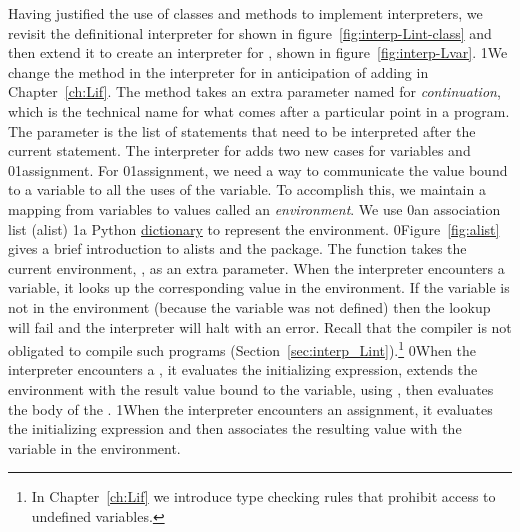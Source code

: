 \documentclass[7x10]{TimesAPriori_MIT}%
\def\racketEd{0}
\def\pythonEd{1}
\def\edition{1}
\newcommand{\racket}[1]{{\if\edition\racketEd{#1}\fi}}
\newcommand{\pythonColor}[0]{}
\newcommand{\python}[1]{{\if\edition\pythonEd\pythonColor #1\fi}}
\numberwithin{theorem}{chapter}
\numberwithin{definition}{chapter}
\numberwithin{equation}{chapter}
\begin{document}
Having justified the use of classes and methods to implement
interpreters, we revisit the definitional interpreter for \LangInt{}
shown in figure~\ref{fig:interp-Lint-class} and then extend it to
create an interpreter for \LangVar{}, shown in
figure~\ref{fig:interp-Lvar}.
%
\python{We change the  method in the interpreter
  for \LangInt{} in anticipation of adding \code{Goto} in
  Chapter~\ref{ch:Lif}. The \code{interp\_stmt} method takes an extra
  parameter named \code{cont} for \emph{continuation}, which is the
  technical name for what comes after a particular point in a
  program. The \code{cont} parameter is the list of statements that
  need to be interpreted after the current statement.}
%
The interpreter for \LangVar{} adds two new cases for
variables and \racket{}\python{assignment}. For
\racket{}\python{assignment}, we need a way to communicate the
value bound to a variable to all the uses of the variable. To
accomplish this, we maintain a mapping from variables to values called
an \emph{environment}.
%
We use
%
\racket{an association list (alist) }%
%
\python{a Python \href{https://docs.python.org/3.10/library/stdtypes.html\#mapping-types-dict}{dictionary} }%
%
to represent the environment.
%
\racket{Figure~\ref{fig:alist} gives a brief introduction to alists
  and the \code{racket/dict} package.}
%
The  function takes the current environment,
, as an extra parameter.  When the interpreter encounters a
variable, it looks up the corresponding value in the environment. If
the variable is not in the environment (because the variable was not
defined) then the lookup will fail and the interpreter will
halt with an error. Recall that the compiler is not obligated to
compile such programs (Section~\ref{sec:interp_Lint}).\footnote{In
  Chapter~\ref{ch:Lif} we introduce type checking rules that
  prohibit access to undefined variables.}
%
\racket{When the interpreter encounters a , it evaluates the
  initializing expression, extends the environment with the result
  value bound to the variable, using \code{dict-set}, then evaluates
  the body of the \key{Let}.}
%
\python{When the interpreter encounters an assignment, it evaluates
   the initializing expression and then associates the resulting value
   with the variable in the environment.}
\end{document}
